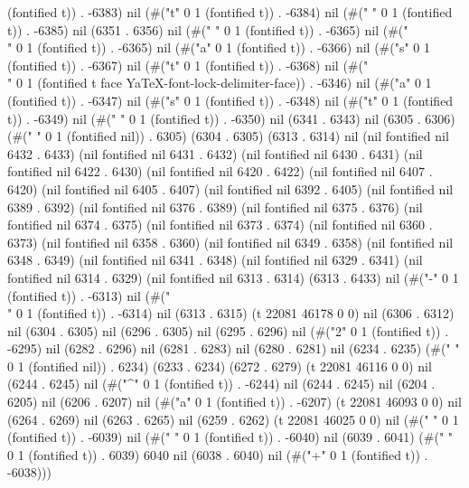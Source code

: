 (fontified t)) . -6383) nil (#("t" 0 1 (fontified t)) . -6384) nil (#(" " 0 1 (fontified t)) . -6385) nil (6351 . 6356) nil (#(" " 0 1 (fontified t)) . -6365) nil (#("\\" 0 1 (fontified t)) . -6365) nil (#("a" 0 1 (fontified t)) . -6366) nil (#("s" 0 1 (fontified t)) . -6367) nil (#("t" 0 1 (fontified t)) . -6368) nil (#("\\" 0 1 (fontified t face YaTeX-font-lock-delimiter-face)) . -6346) nil (#("a" 0 1 (fontified t)) . -6347) nil (#("s" 0 1 (fontified t)) . -6348) nil (#("t" 0 1 (fontified t)) . -6349) nil (#(" " 0 1 (fontified t)) . -6350) nil (6341 . 6343) nil (6305 . 6306) (#(" " 0 1 (fontified nil)) . 6305) (6304 . 6305) (6313 . 6314) nil (nil fontified nil 6432 . 6433) (nil fontified nil 6431 . 6432) (nil fontified nil 6430 . 6431) (nil fontified nil 6422 . 6430) (nil fontified nil 6420 . 6422) (nil fontified nil 6407 . 6420) (nil fontified nil 6405 . 6407) (nil fontified nil 6392 . 6405) (nil fontified nil 6389 . 6392) (nil fontified nil 6376 . 6389) (nil fontified nil 6375 . 6376) (nil fontified nil 6374 . 6375) (nil fontified nil 6373 . 6374) (nil fontified nil 6360 . 6373) (nil fontified nil 6358 . 6360) (nil fontified nil 6349 . 6358) (nil fontified nil 6348 . 6349) (nil fontified nil 6341 . 6348) (nil fontified nil 6329 . 6341) (nil fontified nil 6314 . 6329) (nil fontified nil 6313 . 6314) (6313 . 6433) nil (#("-" 0 1 (fontified t)) . -6313) nil (#("\\" 0 1 (fontified t)) . -6314) nil (6313 . 6315) (t 22081 46178 0 0) nil (6306 . 6312) nil (6304 . 6305) nil (6296 . 6305) nil (6295 . 6296) nil (#("2" 0 1 (fontified t)) . -6295) nil (6282 . 6296) nil (6281 . 6283) nil (6280 . 6281) nil (6234 . 6235) (#(" " 0 1 (fontified nil)) . 6234) (6233 . 6234) (6272 . 6279) (t 22081 46116 0 0) nil (6244 . 6245) nil (#("^" 0 1 (fontified t)) . -6244) nil (6244 . 6245) nil (6204 . 6205) nil (6206 . 6207) nil (#("a" 0 1 (fontified t)) . -6207) (t 22081 46093 0 0) nil (6264 . 6269) nil (6263 . 6265) nil (6259 . 6262) (t 22081 46025 0 0) nil (#("
" 0 1 (fontified t)) . -6039) nil (#(" " 0 1 (fontified t)) . -6040) nil (6039 . 6041) (#(" " 0 1 (fontified t)) . 6039) 6040 nil (6038 . 6040) nil (#("+" 0 1 (fontified t)) . -6038)))
